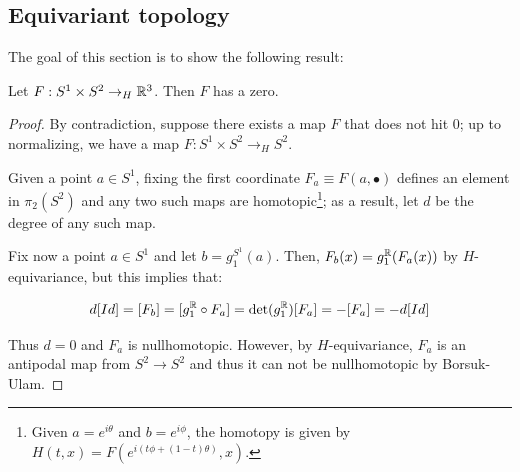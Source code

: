 \documentclass[10pt]{article}
\begin{document}
\subsection{Equivariant topology}

The goal of this section is to show the following result:

\begin{theorem}
  Let $F:S^1\times S^2 \rightarrow_H \mathbb{R}^3$. Then $F$ has a zero.
\end{theorem}

\begin{proof}
  By contradiction, suppose there exists a map $F$ that does not hit $0$; up to normalizing, we have a map
  $F: S^1\times S^2 \rightarrow_H S^2$.

  Given a point $a\in S^1$, fixing the first coordinate $F_a \equiv F(a, \bullet)$ defines an element in $\pi_2(S^2)$
  and any two such maps are homotopic\footnote{Given $a= e^{i\theta}$ and $b=e^{i\phi}$, the homotopy is given by
    $H(t, x) = F(e^{i(t\phi + (1-t)\theta)}, x)$.}; as a result, let $d$ be the degree of any such map.

  Fix now a point $a\in S^1$ and let $b=g_1^{S^1}(a)$. Then, $F_b(x)=g_1^{\mathbb{R}}(F_a(x))$ by $H$-equivariance, but
  this implies that:

  \[
    d[Id] = [F_b] = [g_1^{\mathbb{R}}\circ F_a] = \det(g_1^{\mathbb{R}})[F_a] = - [F_a] = -d[Id]
  \]

  Thus $d = 0$ and $F_a$ is nullhomotopic. However, by $H$-equivariance, $F_a$ is an antipodal map from $S^2\rightarrow S^2$ and thus it can
  not be nullhomotopic by Borsuk-Ulam.
\end{proof}
\end{document}

